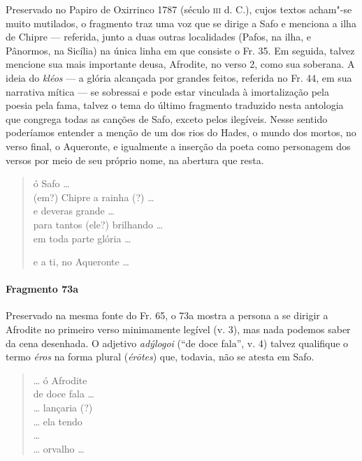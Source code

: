{\small Preservado no Papiro de Oxirrinco 1787  (século \textsc{iii} d. C.), cujos textos acham"-se muito mutilados, o fragmento traz uma voz que se dirige a Safo e menciona a ilha de Chipre --- referida, junto a duas outras localidades (Pafos, na ilha, e Pânormos, na Sicília) na única linha em que consiste o Fr. 35. Em seguida, talvez mencione sua mais importante deusa, Afrodite, no verso 2, como sua soberana. A ideia do \textit{kléos} --- a glória alcançada por grandes feitos, referida no Fr. 44, em sua narrativa mítica --- se sobressai e pode estar vinculada à imortalização pela poesia pela fama, talvez o tema do último fragmento traduzido nesta antologia que congrega todas as canções de Safo, exceto pelos ilegíveis. Nesse sentido poderíamos entender a menção de um dos rios do Hades, o mundo dos mortos, no verso final, o Aqueronte, e igualmente a inserção da poeta como personagem dos versos por meio de seu próprio nome, na abertura que resta.}

\begin{verse}
ó Safo \ldots{}\\
(em?) Chipre a rainha (?) \ldots{}\\
e deveras grande \ldots{}\\
para tantos (ele?) brilhando \ldots{}\\
em toda parte glória \ldots{}

e a ti, no Aqueronte \ldots{}\\
\end{verse}


\paragraph{Fragmento 73a} 

{\small Preservado na mesma fonte do Fr. 65, o 73a mostra a persona a se dirigir a Afrodite no primeiro verso minimamente legível (v. 3), mas nada podemos saber da cena desenhada. O adjetivo \textit{adýlogoi} (``de doce fala'', v. 4) talvez qualifique o termo \textit{éros} na forma plural (\textit{érōtes}) que, todavia, não se atesta em Safo.}

\begin{verse}
\ldots{} ó Afrodite\\
de doce fala \ldots{}\\
\ldots{} lançaria (?)\\
\ldots{} ela tendo\\
\ldots{}\\
\ldots{} orvalho \ldots{}\\
\end{verse}

